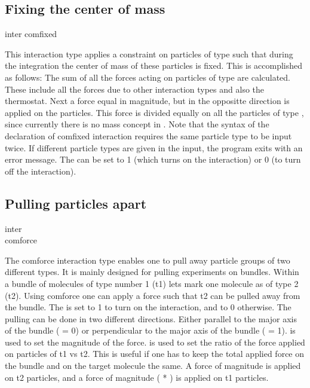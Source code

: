 \subsection{Fixing the center of mass}
\begin{essyntax}
  inter  
  comfixed 
\end{essyntax}
This interaction type applies a constraint on particles of type
 such that during the integration the
center of mass of these particles is fixed. This is accomplished as
follows: The sum of all the forces acting on particles of type
 are calculated. These include all the
forces due to other interaction types and also the thermostat. Next a
force equal in magnitude, but in the oppositte direction is applied on
the particles. This force is divided equally on all the particles of
type , since currently there is no mass
concept in \es. Note that the syntax of the declaration of comfixed
interaction requires the same particle type to be input twice. If
different particle types are given in the input, the program exits
with an error message. The  can be set to 1 (which
turns on the interaction) or 0 (to turn off the interaction).

\subsection{Pulling particles apart}
\begin{essyntax}
  inter  \\
  comforce   
\end{essyntax}
The comforce interaction type enables one to pull away particle groups
of two different types. It is mainly designed for pulling experiments
on bundles. Within a bundle of molecules of type number 1 (t1) lets
mark one molecule as of type 2 (t2). Using comforce one can apply a
force such that t2 can be pulled away from the bundle. The
 is set to 1 to turn on the interaction, and to 0
otherwise. The pulling can be done in two different directions. Either
parallel to the major axis of the bundle (  = 0) or
perpendicular to the major axis of the bundle ( =
1).  is used to set the magnitude of the force.
 is used to set the ratio of the force applied on
particles of t1 vs t2. This is useful if one has to keep the total
applied force on the bundle and on the target molecule the same. A
force of magnitude  is applied on t2 particles,
and a force of magnitude ( *
) is applied on t1 particles.

